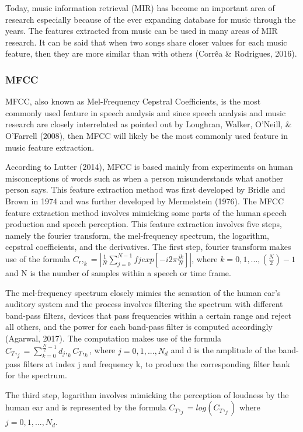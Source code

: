 Today, music information retrieval (MIR) has become an important area of research especially because of the ever expanding database for music through the years. The features extracted from music can be used in many areas of MIR research. It can be said that when two songs share closer values for each music feature, then they are more similar than with others (Corrêa \& Rodrigues, 2016).

\subsubsection{MFCC}

MFCC, also known as Mel-Frequency Cepstral Coefficients, is the most commonly used feature in speech analysis and since speech analysis and music research are closely interrelated as pointed out by Loughran, Walker, O’Neill, \& O’Farrell (2008), then MFCC will likely be the most commonly used feature in music feature extraction.

According to Lutter (2014), MFCC is based mainly from experiments on human misconceptions of words such as when a person misunderstands what another person says. This feature extraction method was first developed by Bridle and Brown in 1974 and was further developed by Mermelstein (1976).  The MFCC feature extraction method involves mimicking some parts of the human speech production and speech perception. This feature extraction involves five steps, namely the fourier transform, the mel-frequency spectrum, the logarithm, cepstral coefficients, and the derivatives. The first step, fourier transform makes use of the formula $C_r,_k=| \frac{1}{N}\sum_{j=0}^{N-1} fj exp [-i 2 \pi \frac{jk}{N}]|$, where $k=0,1,...,(\frac{N}{2})-1$ and N is the number of samples within a speech or time frame.

The mel-frequency spectrum closely mimics the sensation of the human ear’s auditory system and the process involves filtering the spectrum with different band-pass filters, devices that pass frequencies within a certain range and reject all others, and the power for each band-pass filter is computed accordingly (Agarwal, 2017). The computation makes use of the formula $C_T,_j=\sum_{k=0}^{\frac{N}{2}-1} d_j,_k C_T,_k $, where $j=0,1,...,N_d$ and d is the amplitude of the band-pass filters at index j and frequency k, to produce the corresponding filter bank for the spectrum.

The third step, logarithm involves mimicking the perception of loudness by the human ear and is represented by the formula $C_T,_j= log(C_T,_j)$  where $ j=0,1,...,N_d$.

